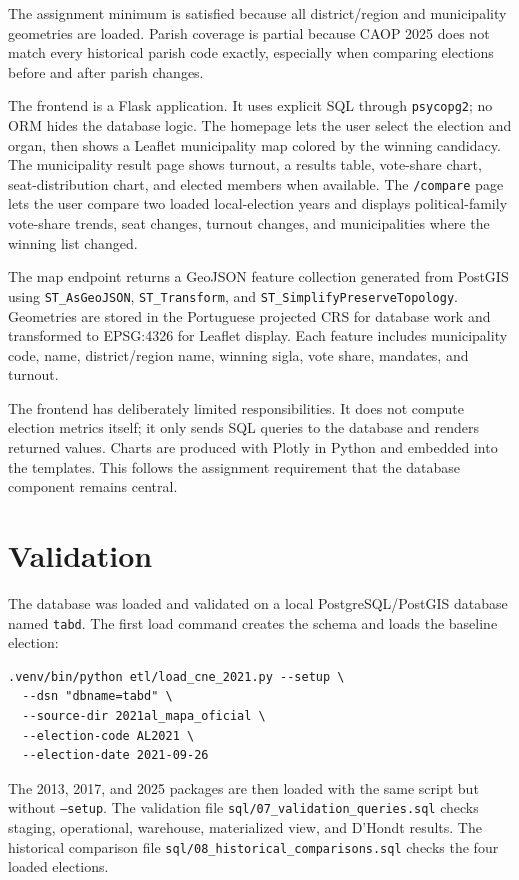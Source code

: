 \documentclass[11pt,twocolumn]{article}
\begin{document}
The assignment minimum is satisfied because all district/region and municipality geometries are loaded. Parish coverage is partial because CAOP 2025 does not match every historical parish code exactly, especially when comparing elections before and after parish changes.

The frontend is a Flask application. It uses explicit SQL through \texttt{psycopg2}; no ORM hides the database logic. The homepage lets the user select the election and organ, then shows a Leaflet municipality map colored by the winning candidacy. The municipality result page shows turnout, a results table, vote-share chart, seat-distribution chart, and elected members when available. The \texttt{/compare} page lets the user compare two loaded local-election years and displays political-family vote-share trends, seat changes, turnout changes, and municipalities where the winning list changed.

The map endpoint returns a GeoJSON feature collection generated from PostGIS using \texttt{ST\_AsGeoJSON}, \texttt{ST\_Transform}, and \texttt{ST\_SimplifyPreserveTopology}. Geometries are stored in the Portuguese projected CRS for database work and transformed to EPSG:4326 for Leaflet display. Each feature includes municipality code, name, district/region name, winning sigla, vote share, mandates, and turnout.

The frontend has deliberately limited responsibilities. It does not compute election metrics itself; it only sends SQL queries to the database and renders returned values. Charts are produced with Plotly in Python and embedded into the templates. This follows the assignment requirement that the database component remains central.

\section{Validation}

The database was loaded and validated on a local PostgreSQL/PostGIS database named \texttt{tabd}. The first load command creates the schema and loads the baseline election:

\begin{verbatim}
.venv/bin/python etl/load_cne_2021.py --setup \
  --dsn "dbname=tabd" \
  --source-dir 2021al_mapa_oficial \
  --election-code AL2021 \
  --election-date 2021-09-26
\end{verbatim}

The 2013, 2017, and 2025 packages are then loaded with the same script but without \texttt{--setup}. The validation file \texttt{sql/07\_validation\_queries.sql} checks staging, operational, warehouse, materialized view, and D'Hondt results. The historical comparison file \texttt{sql/08\_historical\_comparisons.sql} checks the four loaded elections.
\end{document}
